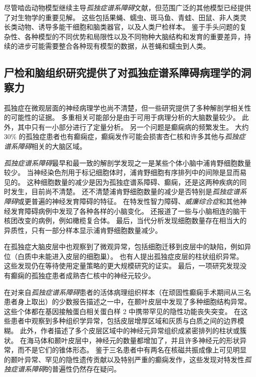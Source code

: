尽管啮齿动物模型继续主导\textit{孤独症谱系障碍}文献，但范围广泛的其他模型已经提供了对生物学的重要见解。
这些包括果蝇、蠕虫、斑马鱼、青蛙、田鼠、非人类灵长类动物、诱导多能干细胞和脑类器官，以及人类尸检样本。
鉴于手头问题的复杂性、各种模型的不同优势和局限性以及不同物种大脑结构和发育的重要差异，持续的进步可能需要整合各种现有模型的数据，从苍蝇和蠕虫到人类。



\subsection{尸检和脑组织研究提供了对孤独症谱系障碍病理学的洞察力}

孤独症在微观层面的神经病理学也尚不清楚，但一些研究提供了多种解剖学相关性的可能性的证据。
多重相关可能部分是由于可用于病理分析的大脑数量较少。
此外，其中只有一小部分进行了定量分析。
另一个问题是癫痫病的频繁发生。
大约 30\% 的孤独症患者也有癫痫症，癫痫发作可能会损害杏仁核和许多其他与\textit{孤独症谱系障碍}相关的大脑区域。


\textit{孤独症谱系障碍}最早和最一致的解剖学发现之一是某些个体小脑中浦肯野细胞数量较少。
当神经染色剂用于标记细胞体时，浦肯野细胞有序排列中的间隙是显而易见的。
这种细胞数量的减少是因为孤独症谱系障碍、癫痫，还是这两种疾病的同时发生，目前尚不清楚。
还不清楚浦肯野细胞数量的减少是否特别是\textit{孤独症谱系障碍}或更普遍的神经发育障碍的特征。
在特发性智力障碍、\textit{威廉综合症}和其他神经发育障碍病例中发现了各种各样的小脑变化。
还报道了一些与小脑相连的脑干核团改变的病例，例如橄榄复合体。
最后，当代分析发现细胞数量存在相当大的异质性，只有一部分样本显示浦肯野细胞数量减少。


在孤独症大脑皮层中也观察到了微观异常，包括细胞迁移到皮层中的缺陷，例如异位（白质中未能进入皮层的细胞巢）。
也有人提出孤独症皮层的柱状组织异常。
这些发现仍在等待使用定量策略的更大规模研究的证实。
最后，一项研究发现没有癫痫的孤独症患者成熟杏仁核中的神经元较少。


在对来自\textit{孤独症谱系障碍}患者的活体病理组织样本（在顽固性癫痫手术期间从三名患者身上取出）的少数报告描述之一中，在颞叶皮层中发现了多种细胞结构异常。
这些个体都在基因接触蛋白相关蛋白样 2 中携带罕见的隐性功能丧失突变。
在这些患者中观察到多种组织学异常，包括皮层增厚区域和灰质与白质之间的边界模糊。
此外，作者描述了多个皮层区域中的神经元异常组织成紧密排列的柱状或簇状。
在海马体和颞叶皮层中，神经元的数量都增加了，并且许多神经元的形状异常，而不是它们的锥体形态。
鉴于三名患者中有两名在核磁共振成像上可见明显的颞叶异常、罕见的隐性遗传贡献以及特别严重的癫痫发作，这些发现对特发性\textit{孤独症谱系障碍}的普遍性仍然存在疑问。


